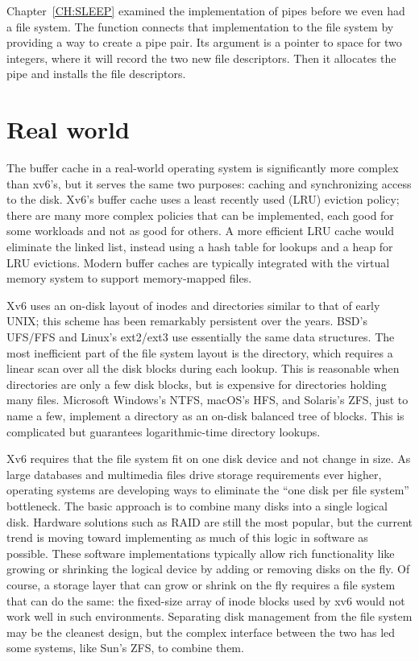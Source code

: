 Chapter~\ref{CH:SLEEP} examined the implementation of pipes
before we even had a file system.
The function
connects that implementation to the file system
by providing a way to create a pipe pair.
Its argument is a pointer to space for two integers,
where it will record the two new file descriptors.
Then it allocates the pipe and installs the file descriptors.
\section{Real world}

The buffer cache in a real-world operating system is significantly
more complex than xv6's, but it serves the same two purposes:
caching and synchronizing access to the disk.
Xv6's buffer cache uses a least recently used (LRU)
eviction policy; there are many more complex
policies that can be implemented, each good for some
workloads and not as good for others.
A more efficient LRU cache would eliminate the linked list,
instead using a hash table for lookups and a heap for LRU evictions.
Modern buffer caches are typically integrated with the
virtual memory system to support memory-mapped files.

Xv6 uses an on-disk layout of inodes and directories
similar to that of early UNIX;
this scheme has been remarkably persistent over the years.
BSD's UFS/FFS and Linux's ext2/ext3 use essentially the same data structures.
The most inefficient part of the file system layout is the directory,
which requires a linear scan over all the disk blocks during each lookup.
This is reasonable when directories are only a few disk blocks,
but is expensive for directories holding many files.
Microsoft Windows's NTFS, macOS's HFS, and Solaris's ZFS, just to name a few, implement
a directory as an on-disk balanced tree of blocks.
This is complicated but guarantees logarithmic-time directory lookups.

Xv6 requires that the file system
fit on one disk device and not change in size.
As large databases and multimedia files drive storage
requirements ever higher, operating systems are developing ways
to eliminate the ``one disk per file system'' bottleneck.
The basic approach is to combine many disks into a single
logical disk.  Hardware solutions such as RAID are still the 
most popular, but the current trend is moving toward implementing
as much of this logic in software as possible.
These software implementations typically 
allow rich functionality like growing or shrinking the logical
device by adding or removing disks on the fly.
Of course, a storage layer that can grow or shrink on the fly
requires a file system that can do the same: the fixed-size array
of inode blocks used by xv6 would not work well
in such environments.
Separating disk management from the file system may be
the cleanest design, but the complex interface between the two
has led some systems, like Sun's ZFS, to combine them.

